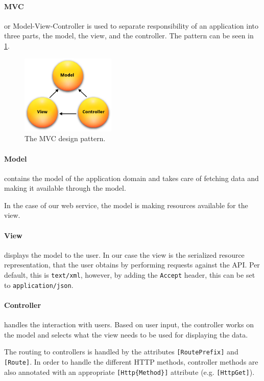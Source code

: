 \paragraph{MVC} or Model-View-Controller\cite{aspmvc} is used to separate responsibility of an application into three parts, the model, the view, and the controller.
The pattern can be seen in \cref{mvcdiagram}.

\begin{figure}[h]
\center
\includegraphics[width=0.4\textwidth]{graphics/mvc}
\caption{The MVC design pattern.\cite{aspmvc}}
\label{mvcdiagram}
\end{figure}

\paragraph{Model} contains the model of the application domain and takes care of fetching data and making it available through the model.

In the case of our web service, the model is making resources available for the view.

\paragraph{View} displays the model to the user.
In our case the view is the serialized resource representation, that the user obtains by performing requests against the API.
Per default, this is \texttt{text/xml}, however, by adding the \texttt{Accept} header, this can be set to \texttt{application/json}.\cite[Section 14]{http_specification}

\paragraph{Controller} handles the interaction with users.
Based on user input, the controller works on the model and selects what the view needs to be used for displaying the data.

The routing to controllers is handled by the attributes \texttt{[RoutePrefix]} and \texttt{[Route]}.
In order to handle the different HTTP methods, controller methods are also annotated with an appropriate \texttt{[Http\{Method\}]} attribute (e.g. \texttt{[HttpGet]}).\cite{asp_routing}